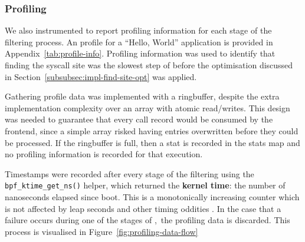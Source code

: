 \subsubsection{Profiling}

We also instrumented \af to report profiling information for each stage of the
filtering process. An profile for a ``Hello, World'' application is provided in 
Appendix~\ref{tab:profile-info}. Profiling information was used to identify that
finding the syscall site was the slowest step of \af before the optimisation
discussed in Section~\ref{subsubsec:impl-find-site-opt} was applied.

Gathering profile data was implemented with a ringbuffer, despite the extra
implementation complexity over an array with atomic read/writes. This design was
needed to guarantee that every call record would be consumed by the frontend, since a 
simple array risked having entries overwritten before they could be processed.
If the ringbuffer is full, then a stat is recorded in the stats map and no
profiling information is recorded for that execution.

Timestamps were recorded after every stage of the filtering using the
\texttt{bpf\_ktime\_get\_ns()} helper, which returned the \textbf{kernel time}:
the number of nanoseconds elapsed since boot. This is a monotonically increasing
counter which is not affected by leap seconds and other timing oddities \cite{ebpf-bpf-ktime-get-ns-2025}. In the
case that a failure occurs during one of the stages of \afss,~the profiling data
is discarded. This process is visualised in Figure~\ref{fig:profiling-data-flow}


